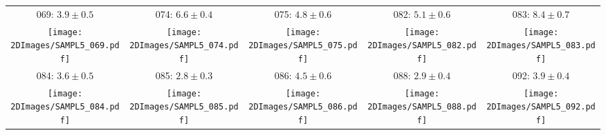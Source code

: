 \begin{tabular}{|c c c c c|}
{\tiny 069: $ 3.9 \pm 0.5 $ } & {\tiny 074: $ 6.6 \pm 0.4 $ } & {\tiny 075: $ 4.8 \pm 0.6 $ } & {\tiny 082: $ 5.1 \pm 0.6 $ } & {\tiny 083: $ 8.4 \pm 0.7 $ } \\ 
\texttt{[image: 2DImages/SAMPL5\_069.pdf]} & \texttt{[image: 2DImages/SAMPL5\_074.pdf]} & \texttt{[image: 2DImages/SAMPL5\_075.pdf]} & \texttt{[image: 2DImages/SAMPL5\_082.pdf]} & \texttt{[image: 2DImages/SAMPL5\_083.pdf]} \\ 
{\tiny 084: $ 3.6 \pm 0.5 $ } & {\tiny 085: $ 2.8 \pm 0.3 $ } & {\tiny 086: $ 4.5 \pm 0.6 $ } & {\tiny 088: $ 2.9 \pm 0.4 $ } & {\tiny 092: $ 3.9 \pm 0.4 $ } \\ 
\texttt{[image: 2DImages/SAMPL5\_084.pdf]} & \texttt{[image: 2DImages/SAMPL5\_085.pdf]} & \texttt{[image: 2DImages/SAMPL5\_086.pdf]} & \texttt{[image: 2DImages/SAMPL5\_088.pdf]} & \texttt{[image: 2DImages/SAMPL5\_092.pdf]} \\ 
\hline
\end{tabular}
